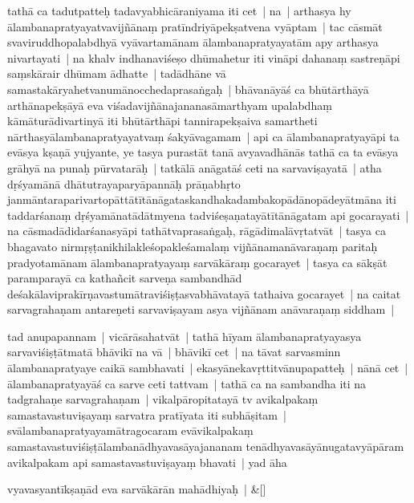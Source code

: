 \documentclass[article,12pt,a4paper]{memoir}%
\newcounter{parCount}
\begin{document}
	  \pstart \leavevmode%
	\label{thakur75-11.27}tathā ca tadutpatteḥ tadavyabhicāraniyama iti cet | na | arthasya hy ālambanapratyayatvavijñānaṃ pratīndriyāpekṣatvena vyāptam | tac cāsmāt svaviruddhopalabdhyā vyāvartamānam ālambanapratyayatām apy arthasya nivartayati | na khalv indhanaviśeṣo dhūmahetur iti vināpi dahanaṃ sastreṇāpi saṃskārair dhūmam ādhatte | tadādhāne vā samastakāryahetvanumānocchedaprasaṅgaḥ | bhāvanāyāś ca bhūtārthāyā arthānapekṣāyā eva viśadavijñānajananasāmarthyam upalabdhaṃ kāmāturādivartinyā iti bhūtārthāpi tannirapekṣaiva samartheti nārthasyālambanapratyayatvaṃ śakyāvagamam | api ca ālambanapratyayāpi ta evāsya kṣaṇā yujyante, ye tasya purastāt tanā avyavadhānās tathā ca ta evāsya grāhyā na punaḥ pūrvatarāḥ | tatkālā anāgatāś ceti na sarvaviṣayatā | atha dṛśyamānā dhātutrayaparyāpannāḥ prāṇabhṛto janmāntaraparivartopāttātītānāgataskandhakadambakopādānopādeyātmāna iti taddarśanaṃ dṛśyamānatādātmyena tadviśeṣaṇatayātītānāgatam api gocarayati | na cāsmadādidarśanasyāpi tathātvaprasaṅgaḥ, rāgādimalāvṛtatvāt | tasya ca bhagavato nirmṛṣṭanikhilakleśopakleśamalaṃ vijñānamanāvaraṇaṃ paritaḥ pradyotamānam ālambanapratyayaṃ sarvākāraṃ gocarayet | tasya ca sākṣāt paramparayā ca kathañcit sarveṇa sambandhād deśakālaviprakīrṇavastumātraviśiṣṭasvabhāvatayā tathaiva gocarayet | na caitat sarvagrahaṇam antareṇeti sarvaviṣayam asya vijñānam anāvaraṇaṃ siddham | 
	{}
	\pend%
      

	  \pstart \leavevmode%
	\label{thakur75-12.16}tad anupapannam | vicārāsahatvāt | tathā hīyam ālambanapratyayasya sarvaviśiṣṭātmatā bhāvikī na vā | bhāvikī cet | na tāvat sarvasminn ālambanapratyaye caikā sambhavati | ekasyānekavṛttitvānupapatteḥ | nānā cet | ālambanapratyayāś ca sarve ceti tattvam | tathā ca na sambandha iti na tadgrahaṇe sarvagrahaṇam | vikalpāropitatayā tv avikalpakaṃ samastavastuviṣayaṃ sarvatra pratīyata iti subhāṣitam | svālambanapratyayamātragocaram evāvikalpakaṃ samastavastuviśiṣṭālambanādhyavasāyajananam tenādhyavasāyānugatavyāpāram avikalpakam api samastavastuviṣayaṃ bhavati | yad āha 
	{}
	\pend%
      
	    
	    \stanza[\smallbreak]
	  vyavasyantīkṣaṇād eva sarvākārān mahādhiyaḥ | \&[\smallbreak]
	  
\end{document}

